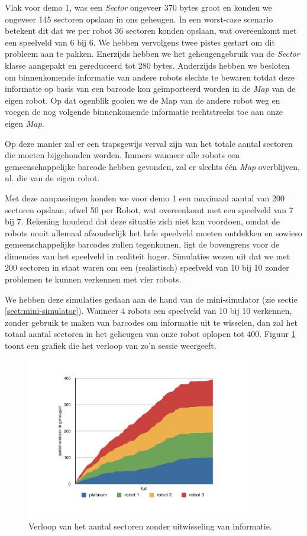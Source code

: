 \documentclass[12pt,a4paper]{report}
\begin{document}
Vlak voor demo 1, was een \emph{Sector} ongeveer 370 bytes groot en konden we ongeveer 145 sectoren opslaan in ons geheugen. In een worst-case scenario betekent dit dat we per robot 36 sectoren konden opslaan, wat overeenkomt met een speelveld van 6 bij 6. We hebben vervolgens twee pistes gestart om dit probleem aan te pakken. Enerzijds hebben we het geheugengebruik van de \emph{Sector} klasse aangepakt en gereduceerd tot 280 bytes. Anderzijds hebben we besloten om binnenkomende informatie van andere robots slechts te bewaren totdat deze informatie op basis van een barcode kon ge\"importeerd worden in de \emph{Map} van de eigen robot. Op dat ogenblik gooien we de Map van de andere robot weg en voegen de nog volgende binnenkomende informatie rechtstreeks toe aan onze eigen \emph{Map}.

Op deze manier zal er een trapsgewijs verval zijn van het totale aantal sectoren die moeten bijgehouden worden. Immers wanneer alle robots een gemeenschappelijke barcode hebben gevonden, zal er slechts \'e\'en \emph{Map} overblijven, nl. die van de eigen robot.

Met deze aanpassingen konden we voor demo 1 een maximaal aantal van 200 sectoren opslaan, ofwel 50 per Robot, wat overeenkomt met een speelveld van 7 bij 7. Rekening houdend dat deze situatie zich niet kan voordoen, omdat de robots nooit allemaal afzonderlijk het hele speelveld moeten ontdekken en sowieso gemeenschappelijke barcodes zullen tegenkomen, ligt de bovengrens voor de dimensies van het speelveld in realiteit hoger. Simulaties wezen uit dat we met 200 sectoren in staat waren om een (realistisch) speelveld van 10 bij 10 zonder problemen te kunnen verkennen met vier robots.

We hebben deze simulaties gedaan aan de hand van de mini-simulator (zie sectie \ref{sect:mini-simulator}). Wanneer 4 robots een speelveld van 10 bij 10 verkennen, zonder gebruik te maken van barcodes om informatie uit te wisselen, dan zal het totaal aantal sectoren in het geheugen van onze robot oplopen tot 400. Figuur \ref{chart:sectors-no-merge} toont een grafiek die het verloop van zo'n sessie weergeeft.

\begin{figure}[htbp]
  \centering
  \includegraphics[width=100mm]{resources/sectors-no-merge.pdf}
  \caption{Verloop van het aantal sectoren zonder uitwisseling van informatie.}
  \label{chart:sectors-no-merge}
\end{figure}
\end{document}
